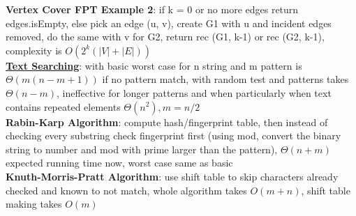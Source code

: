 \documentclass[a4paper]{article}
\begin{document}
\begin{multicols}{2}
        \textbf{Vertex Cover FPT Example 2}: if k = 0 or no more edges return edges.isEmpty, else pick an edge (u, v), create G1 with u and incident edges removed, do the same with v for G2, return rec (G1, k-1) or rec (G2, k-1), complexity is $O(2^k (|V|+|E|))$\\
        \underline{\textbf{Text Searching}}: with basic worst case for n string and m pattern is $\Theta(m(n-m+1))$ if no pattern match, with random test and patterns takes $\Theta(n-m)$, ineffective for longer patterns and when particularly when text contains repeated elements $\Theta(n^2), m=n/2$\\
        \textbf{Rabin-Karp Algorithm}: compute hash/fingerprint table, then instead of checking every substring check fingerprint first (using mod, convert the binary string to number and mod with prime larger than the pattern), $\Theta(n+m)$ expected running time now, worst case same as basic\\
        \textbf{Knuth-Morris-Pratt Algorithm}: use shift table to skip characters already checked and known to not match, whole algorithm takes $O(m+n)$, shift table making takes $O(m)$\\
    \end{multicols}
    
\end{document}
